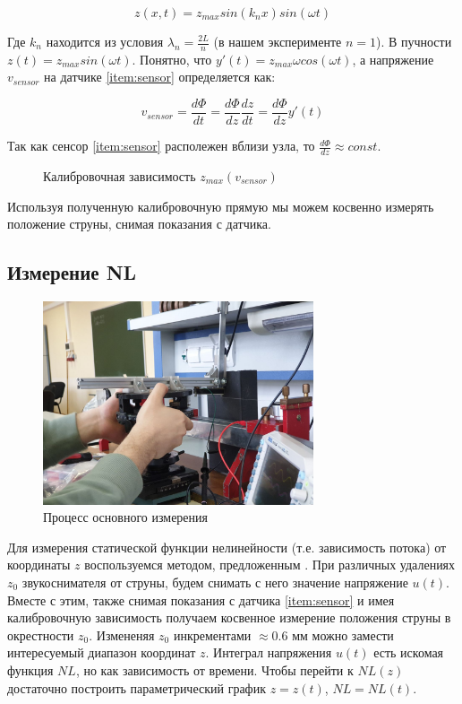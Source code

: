 \documentclass{article}
\begin{document}
\begin{equation}
    z(x, t) = z_{max} sin(k_n x) sin(\omega t)
\end{equation}

Где $k_n$ находится из условия $\lambda_n = \frac{2 L}{n}$ (в нашем эксперименте $n = 1$).
В пучности $z(t) = z_{max} sin(\omega t)$. Понятно, что $y'(t) = z_{max} \omega cos(\omega t)$, а напряжение $v_{sensor}$
на датчике \ref{item:sensor} определяется как:

\begin{equation}
    v_{sensor} = \frac{d \Phi}{dt} = \frac{d \Phi}{dz} \frac{dz}{dt} = \frac{d \Phi}{dz} y'(t)
\end{equation}

Так как сенсор \ref{item:sensor} располежен вблизи узла, то $\frac{d \Phi}{dz} \approx const$.

\begin{figure}[h]
    \centering
    
    \caption{Калибровочная зависимость $z_{max}(v_{sensor})$}
    \label{fig:model}
\end{figure}

Используя полученную калибровочную прямую мы можем косвенно измерять положение струны,
снимая показания с датчика.

\subsection{Измерение NL}

\begin{figure}[h]
    \centering
    \includegraphics[width=8cm]{drawings/measurement.jpeg}
		\caption{Процесс основного измерения}
    \label{fig:lab-setup}
\end{figure}


Для измерения статической функции нелинейности (т.е. зависимость потока) от координаты $z$
воспользуемся методом, предложенным \cite{novak:hal-02512148}. При различных удалениях $z_0$ звукоснимателя от струны,
будем снимать с него значение напряжение $u(t)$. Вместе с этим, также снимая показания с датчика \ref{item:sensor} и имея
калибровочную зависимость получаем косвенное измерение положения струны в окрестности $z_0$. Измененяя $z_0$ инкрементами
$\approx 0.6$ мм можно замести интересуемый диапазон координат $z$. 
Интеграл напряжения $u(t)$ есть искомая функция $NL$, но как
зависимость от времени. Чтобы перейти к $NL(z)$ достаточно построить параметрический график $z = z(t)$, $NL = NL(t)$.
\end{document}
